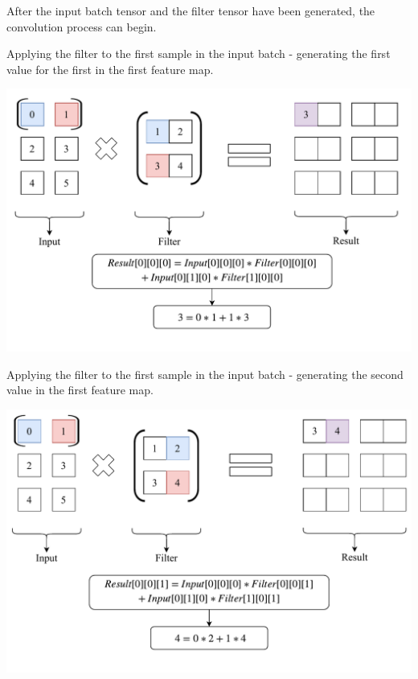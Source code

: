 \documentclass[a4paper, 12pt]{report}
\begin{document}
\newpage
After the input batch tensor and the filter tensor have been generated, the convolution process can begin.\\
\begin{blockfigure}{ Applying the filter to the first sample in the input batch - generating the first value for the first  in the first feature map.}
	\begin{center}
		\includegraphics[width=\textwidth]{firstConvSample_step1}
	\end{center}
\end{blockfigure}
\begin{blockfigure}{ Applying the filter to the first sample in the input batch - generating the second value in the first feature map.}
	\begin{center}
		\includegraphics[width=\textwidth]{firstConvSample_step2}
	\end{center}
\end{blockfigure}
\end{document}

